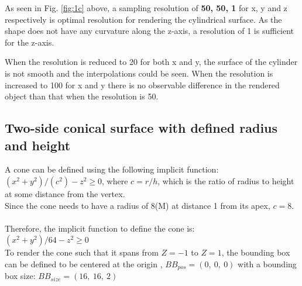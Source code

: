\documentclass[acmlarge,nonacm=true]{acmart}
\begin{document}
As seen in Fig. \ref{fig:1c} above, a sampling resolution of \textbf{50, 50, 1} for x, y and z respectively is optimal 
resolution for rendering the cylindrical surface. As the shape does not have any curvature along the z-axis, a resolution 
of 1 is sufficient for the z-axis.

When the resolution is reduced to 20 for both x and y,  the surface of the cylinder is 
not smooth and the interpolations could be seen. When the resolution is increased to 100 for x and y there 
is no observable difference in the rendered object than that when the resolution is 50.

\newpage
\subsection{Two-side conical surface with defined radius and height}
\label{section:1d}
A cone can be defined using the following implicit function:\\
$(x^2 + y^2)/(c^2) - z^2 \geq 0$, where $c = r/h$, which is the ratio of radius to height at some distance from the vertex.\\
Since the cone needs to have a radius of 8(M) at distance 1 from its apex, $c = 8$.\\\\
Therefore, the implicit function to define the cone is:\\
$(x^2 + y^2)/64 - z^2 \geq 0$\\
To render the cone such that it spans from $Z=-1$ to $Z=1$, the bounding box can be defined to be centered at the origin
, $BB_{pos} = (0,\ 0,\ 0)$ with a bounding box size: $BB_{size} = (16,\ 16,\ 2)$\\\\ 
\end{document}
